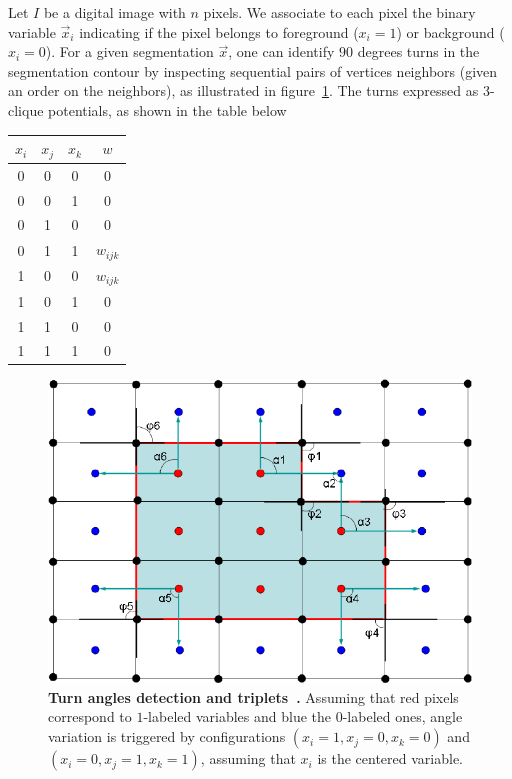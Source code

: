 Let $I$ be a digital image with $n$ pixels. We associate to each pixel the binary variable $\vec{x}_i$ indicating if the pixel belongs to foreground ($x_i=1$) or background ($x_i=0$). For a given segmentation $\vec{x}$, one can identify $90$ degrees turns in the segmentation contour by inspecting sequential pairs of vertices neighbors (given an order on the neighbors), as illustrated in figure~\cref{ch3:fig:elzehiry-turn-angles}. The turns  expressed as $3$-clique potentials, as shown in the table below

\begin{center}
\begin{tabular}{|c|c|c|c|}
\hline
$x_i$ & $x_j$ & $x_k$ & $w$ \\
\hline 
0 & 0 & 0 & 0 \\
0 & 0 & 1 & 0 \\
0 & 1 & 0 & 0 \\
0 & 1 & 1 & $w_{ijk}$ \\
1 & 0 & 0 & $w_{ijk}$ \\
1 & 0 & 1 & 0 \\
1 & 1 & 0 & 0 \\
1 & 1 & 1 & 0 \\
\hline 
\end{tabular}
\end{center}

\begin{figure}
\center
\includegraphics[scale=0.25]{figures/chapter3/elzehiry/turn-angles.png}
\caption{\textbf{Turn angles detection and triplets~\cite{zehiry10fast}.} Assuming that red pixels correspond to $1$-labeled variables and blue the $0$-labeled ones, angle variation is triggered by configurations $(x_i=1,x_j=0,x_k=0)$ and $(x_i=0,x_j=1,x_k=1)$, assuming that $x_i$ is the centered variable. }
\label{ch3:fig:elzehiry-turn-angles}
\end{figure}

